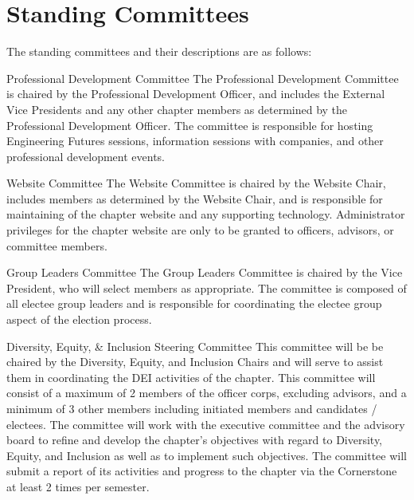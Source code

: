 \section{Standing Committees}\label{sec:standingCommittees}
The standing committees and their descriptions are as follows:
\begin{enumsubsection}
	\item{Professional Development Committee}
	The Professional Development Committee is chaired by the Professional Development Officer, and includes the External Vice Presidents and any other chapter members as determined by the Professional Development Officer.
	The committee is responsible for hosting Engineering Futures sessions, information sessions with companies, and other professional development events.
	\item{Website Committee}
	\label{com-website} The Website Committee is chaired by the Website Chair, includes members as determined by the Website Chair, and is responsible for maintaining of the chapter website and any supporting technology.
	Administrator privileges for the chapter website are only to be granted to officers, advisors, or committee members.
	\item{Group Leaders Committee}
	The Group Leaders Committee is chaired by the Vice President, who will select members as appropriate.
	The committee is composed of all electee group leaders and is responsible for coordinating the electee group aspect of the election process.
  \item{Diversity, Equity, \& Inclusion Steering Committee}
  This committee will be be chaired by the Diversity, Equity, and Inclusion Chairs and will serve to assist them in coordinating the DEI activities of the chapter.
  This committee will consist of a maximum of 2 members of the officer corps, excluding advisors, and a minimum of 3 other members including initiated members and candidates / electees.
  The committee will work with the executive committee and the advisory board to refine and develop the chapter's objectives with regard to Diversity, Equity, and Inclusion as well as to implement such objectives.
  The committee will submit a report of its activities and progress to the chapter via the Cornerstone at least 2 times per semester.


\end{enumsubsection}
